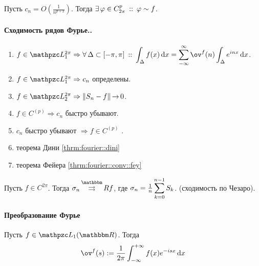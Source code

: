 \documentclass[12pt,draft,timbord]{longnotes}
\begin{document}
\begin{prop}\label{prop:fourier::coef::equiv}
  Пусть $\displaystyle c_n = O \left(\frac{1}{n^{p+2}}\right)$. 
  Тогда $\exists\, \varphi \in C^p_{2\pi}\:::\: \varphi \sim f$.
\end{prop}

\paragraph{Сходимость рядов Фурье..}
\label{par:fourier::conv}

\begin{enumerate}[$1^\circ$]
  \item $f\in \summb_1^{2\pi} \Rightarrow 
    \forall\, \Delta \subset [-\pi,\pi] \holds 
    \dint_\Delta f(x) \, \del x = \sum_{-\infty}^\infty \ov^{f} (n) \int_\Delta e^{inx}\, \del x$.
  \item $f\in \summb_1^{2\pi} \Rightarrow c_n$ определены.
  \item $f\in \summb_2^{2\pi} \Rightarrow \|S_n - f\| \to 0$.
  \item $f\in C^{(p)} \Rightarrow c_n$ быстро убывают.
  \item $c_n$ быстро убывают $\Rightarrow f\in C^{(p)}$ .
  \item теорема Дини \ref{thrm:fourier::dini}
  \item теорема Фейера \ref{thrm:fourier::conv::fey}
\end{enumerate}

\begin{thrm}[Фейера]\label{thrm:fourier::conv::fey}
  Пусть $f\in C^{2\pi}$. Тогда $ \sigma_n \unito^\R f$, 
  где $\sigma_n = \frac{1}{n} \displaystyle\sum_{k=0}^{n-1} S_k$. (сходимость по Чезаро).
\end{thrm}

\paragraph{Преобразование Фурье}
\label{par:fourier::transform}

\begin{defn}\label{defn:fourier::transform}
  Пусть $f \in \summb_1 (\R)$. Тогда\[
    \ov^{f} (s) := \frac{1}{2\pi}  \intR f(x) e^{-isx} \, \del x
  \]
\end{defn}
\end{document}
